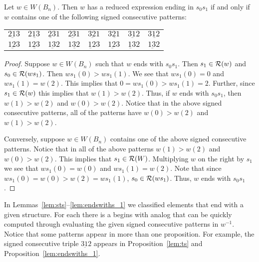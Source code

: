\begin{proposition}\label{lem:endswiths_1}
Let $w \in W(B_n)$. Then $w$ has a reduced expression ending in $s_0s_1$ if and only if $w$ contains one of the following signed consecutive patterns:
\begin{center}
\begin{tabular}{llllllll}
$2 \underbar{1} 3$ & $ 2 \underbar{13}$ & $ \underbar{23}1$  & $ \underbar{231}$  & $3\underbar{2}1 $ & $ 3 \underbar{21}$ & $ 3 \underbar{1}2$ & $ 3\underbar{12}$ \\
$ 1 \underbar{2}3$ & $ 1 \underbar{23}$ & $ 1 \underbar{3}2$ & $ 1 \underbar{32}$ & $ \underbar{12}3$ & $ \underbar{123}$  & $ \underbar{13}2$  & $ \underbar{132}$
\end{tabular}
\end{center}
\begin{proof}
	Suppose $w \in W(B_n)$ such that $w$ ends with $s_0s_1$. Then $s_1 \in \mathcal{R}(w)$ and $s_0 \in \mathcal{R}(ws_1)$. Then $ws_1(0)>ws_1(1)$. We see that $ws_1(0)=0$ and $ws_1(1)=w(2)$. This implies that $0=ws_1(0)>ws_1(1)=2$. Further, since $s_1 \in \mathcal{R}(w)$ this implies that $w(1) > w(2)$. Thus, if $w$ ends with $s_0s_1$, then $w(1)>w(2)$ and $w(0)>w(2)$. Notice that in the above signed consecutive patterns, all of the patterns have $w(0)>w(2)$ and $w(1)>w(2)$.
	
	Conversely, suppose $w \in W(B_n)$ contains one of the above signed consecutive patterns. Notice that in all of the above patterns $w(1)>w(2)$ and $w(0)>w(2)$. This implies that $s_1 \in \mathcal{R}(W)$. Multiplying $w$ on the right by $s_1$ we see that $ws_1(0)=w(0)$ and $ws_1(1)=w(2)$. Note that since $ws_1(0)=w(0)>w(2)=ws_1(1)$, $s_0 \in \mathcal{R}(ws_1)$. Thus, $w$ ends with $s_0s_1$. 
\end{proof}	
\end{proposition}

\begin{remark}
In Lemmas~\ref{lem:sts}--\ref{lem:endswiths_1} we classified elements that end with a given structure. For each there is a begins with analog that can be quickly computed through evaluating the given signed consecutive patterns in $w^{-1}$. Notice that some patterns appear in more than one proposition. For example, the signed consecutive triple $3\underbar{1}2$ appears in Proposition~\ref{lem:ts} and Proposition~\ref{lem:endswiths_1}.
\end{remark}


